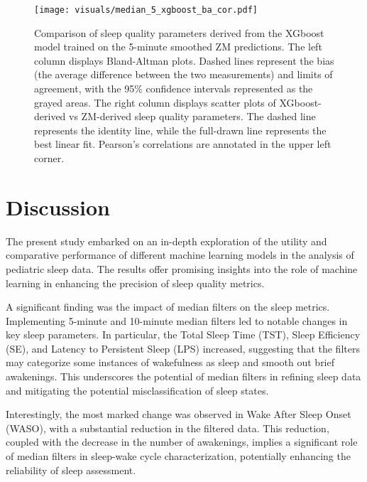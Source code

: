 \documentclass[
  super,
  preprint,
  3p]{elsarticle}
\begin{document}
\begin{figure}[b]

{\centering \texttt{[image: visuals/median\_5\_xgboost\_ba\_cor.pdf]}

}

\caption{\label{fig-xgb_ba_cor}Comparison of sleep quality parameters
derived from the XGboost model trained on the 5-minute smoothed ZM
predictions. The left column displays Bland-Altman plots. Dashed lines
represent the bias (the average difference between the two measurements)
and limits of agreement, with the 95\% confidence intervals represented
as the grayed areas. The right column displays scatter plots of
XGboost-derived vs ZM-derived sleep quality parameters. The dashed line
represents the identity line, while the full-drawn line represents the
best linear fit. Pearson's correlations are annotated in the upper left
corner.}

\end{figure}

\hypertarget{discussion}{%
\section{Discussion}\label{discussion}}

The present study embarked on an in-depth exploration of the utility and
comparative performance of different machine learning models in the
analysis of pediatric sleep data. The results offer promising insights
into the role of machine learning in enhancing the precision of sleep
quality metrics.

A significant finding was the impact of median filters on the sleep
metrics. Implementing 5-minute and 10-minute median filters led to
notable changes in key sleep parameters. In particular, the Total Sleep
Time (TST), Sleep Efficiency (SE), and Latency to Persistent Sleep (LPS)
increased, suggesting that the filters may categorize some instances of
wakefulness as sleep and smooth out brief awakenings. This underscores
the potential of median filters in refining sleep data and mitigating
the potential misclassification of sleep states.

Interestingly, the most marked change was observed in Wake After Sleep
Onset (WASO), with a substantial reduction in the filtered data. This
reduction, coupled with the decrease in the number of awakenings,
implies a significant role of median filters in sleep-wake cycle
characterization, potentially enhancing the reliability of sleep
assessment.
\end{document}
